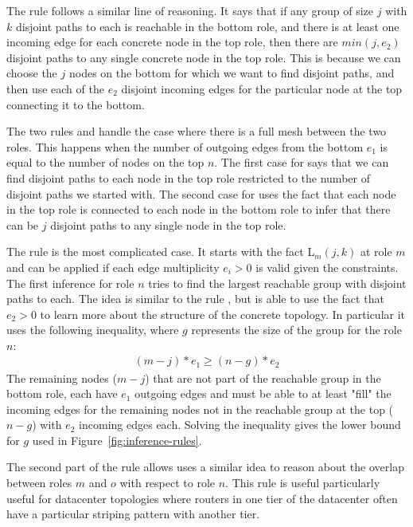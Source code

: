\documentclass[numbers, 10pt, preprint]{sigplanconf}
\begin{document}
The rule  follows a similar line of reasoning. It says that if any group of size $j$ with $k$ disjoint paths to each is reachable in the bottom role, and there is at least one incoming edge for each concrete node in the top role, then there are $min(j,e_2)$ disjoint paths to any single concrete node in the top role. This is because we can choose the $j$ nodes on the bottom for which we want to find disjoint paths, and then use each of the $e_2$ disjoint incoming edges for the particular node at the top connecting it to the bottom.

The two rules  and  handle the case where there is a full mesh between the two roles. This happens when the number of outgoing edges from the bottom $e_1$ is equal to the number of nodes on the top $n$. The first case for  says that we can find disjoint paths to each node in the top role restricted to the number of disjoint paths we started with. The second case for  uses the fact that each node in the top role is connected to each node in the bottom role to infer that there can be $j$ disjoint paths to any single node in the top role.

The rule  is the most complicated case.
It starts with the fact L$_m(j,k)$ at role $m$ and can be applied if each edge multiplicity $e_i > 0$ is valid given the constraints. The first inference for role $n$ tries to find the largest reachable group with disjoint paths to each. The idea is similar to the rule , but is able to use the fact that $e_2 > 0$ to learn more about the structure of the concrete topology. In particular it uses the following inequality, where $g$ represents the size of the group for the role $n$:
%
\[ \begin{array}{c}
  (m-j)*e_1 \geq (n-g)*e_2
\end{array} \]
\noindent
%
The remaining nodes ($m-j$) that are not part of the reachable group in the bottom role, each have $e_1$ outgoing edges and must be able to at least "fill" the incoming edges for the remaining nodes not in the reachable group at the top ($n-g$) with $e_2$ incoming edges each. Solving the inequality gives the lower bound for $g$ used in Figure~\ref{fig:inference-rules}.

The second part of the rule allows uses a similar idea to reason about the overlap between roles $m$ and $o$ with respect to role $n$. This rule is useful particularly useful for datacenter topologies where routers in one tier of the datacenter often have a particular striping pattern with another tier.
\end{document}
